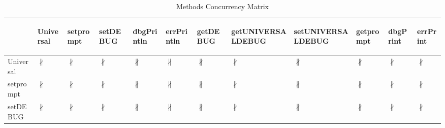 \documentclass[10pt]{article}
\begin{document}
\begin{longtable}{|l|l|l|l|l|l|l|l|l|l|l|l|}
\caption{Methods Concurrency Matrix}\\
\hline
&\begin{sideways}Universal\end{sideways}&\begin{sideways}setprompt\end{sideways}&\begin{sideways}setDEBUG\end{sideways}&\begin{sideways}dbgPrintln\end{sideways}&\begin{sideways}errPrintln\end{sideways}&\begin{sideways}getDEBUG\end{sideways}&\begin{sideways}getUNIVERSALDEBUG\end{sideways}&\begin{sideways}setUNIVERSALDEBUG\end{sideways}&\begin{sideways}getprompt\end{sideways}&\begin{sideways}dbgPrint\end{sideways}&\begin{sideways}errPrint\end{sideways}\\
\hline
Universal&{\color{BrickRed}$\nparallel$}&{\color{BrickRed}$\nparallel$}&{\color{BrickRed}$\nparallel$}&{\color{BrickRed}$\nparallel$}&{\color{BrickRed}$\nparallel$}&{\color{BrickRed}$\nparallel$}&{\color{BrickRed}$\nparallel$}&{\color{BrickRed}$\nparallel$}&{\color{BrickRed}$\nparallel$}&{\color{BrickRed}$\nparallel$}&{\color{BrickRed}$\nparallel$}\\
\hline
setprompt&{\color{BrickRed}$\nparallel$}&{\color{BrickRed}$\nparallel$}&{\color{BrickRed}$\nparallel$}&{\color{BrickRed}$\nparallel$}&{\color{BrickRed}$\nparallel$}&{\color{BrickRed}$\nparallel$}&{\color{BrickRed}$\nparallel$}&{\color{BrickRed}$\nparallel$}&{\color{BrickRed}$\nparallel$}&{\color{BrickRed}$\nparallel$}&{\color{BrickRed}$\nparallel$}\\
\hline
setDEBUG&{\color{BrickRed}$\nparallel$}&{\color{BrickRed}$\nparallel$}&{\color{BrickRed}$\nparallel$}&{\color{BrickRed}$\nparallel$}&{\color{BrickRed}$\nparallel$}&{\color{BrickRed}$\nparallel$}&{\color{BrickRed}$\nparallel$}&{\color{BrickRed}$\nparallel$}&{\color{BrickRed}$\nparallel$}&{\color{BrickRed}$\nparallel$}&{\color{BrickRed}$\nparallel$}\\

\end{longtable}
\end{document}
